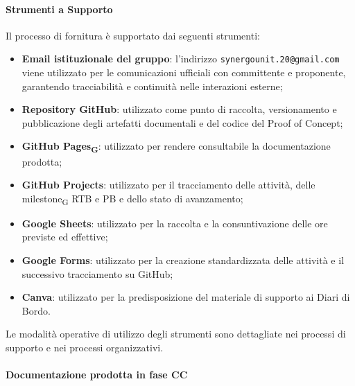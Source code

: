 \paragraph{Strumenti a Supporto}

Il processo di fornitura è supportato dai seguenti strumenti:

\begin{itemize}
      \item \textbf{Email istituzionale del gruppo}: l'indirizzo
            \texttt{synergounit.20@gmail.com} viene utilizzato per le comunicazioni ufficiali
            con committente e proponente, garantendo tracciabilità e continuità nelle
            interazioni esterne;

      \item \textbf{Repository GitHub}: utilizzato come punto di raccolta, versionamento
        e pubblicazione degli artefatti documentali e del codice del Proof of Concept;

      \item \textbf{GitHub Pages\textsubscript{G}}: utilizzato per rendere consultabile la documentazione
      prodotta;

      \item \textbf{GitHub Projects}: utilizzato per il tracciamento delle attività,
      delle milestone\textsubscript{G} RTB e PB e dello stato di avanzamento;

      \item \textbf{Google Sheets}: utilizzato per la raccolta e la consuntivazione
      delle ore previste ed effettive;

      \item \textbf{Google Forms}: utilizzato per la creazione standardizzata delle
      attività e il successivo tracciamento su GitHub;

      \item \textbf{Canva}: utilizzato per la predisposizione del materiale di supporto
      ai Diari di Bordo.
\end{itemize}

Le modalità operative di utilizzo degli strumenti sono dettagliate nei processi
di supporto e nei processi organizzativi.


\paragraph{Documentazione prodotta in fase CC}

